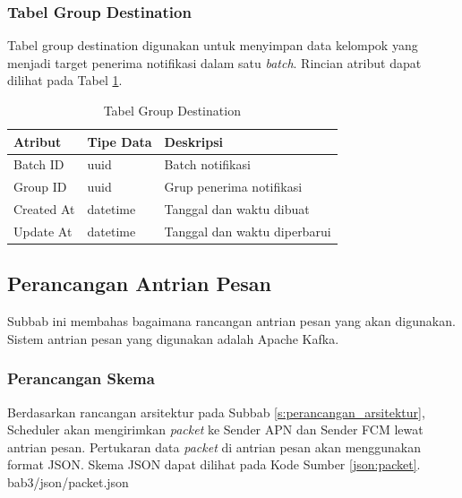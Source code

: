 \subsubsection{Tabel Group Destination}
\par Tabel group destination digunakan untuk menyimpan data kelompok yang menjadi target penerima notifikasi dalam satu \textit{batch}. Rincian atribut dapat dilihat pada Tabel \ref{tabel_group_destination}.
\begin{longtable}{|p{2cm}|p{2.5cm}|p{4.5cm}|}
	\caption{Tabel Group Destination} \label{tabel_group_destination} \\ \hline
    \textbf{Atribut} & \textbf{Tipe Data} & \textbf{Deskripsi} \\ \hline
    Batch ID & uuid & Batch notifikasi \\ \hline
    Group ID & uuid & Grup penerima notifikasi \\ \hline
    Created At & datetime & Tanggal dan waktu dibuat \\ \hline
    Update At & datetime & Tanggal dan waktu diperbarui \\ \hline
\end{longtable}

\subsection{Perancangan Antrian Pesan}
\par Subbab ini membahas bagaimana rancangan antrian pesan yang akan digunakan. Sistem antrian pesan yang digunakan adalah Apache Kafka.

\subsubsection{Perancangan Skema}
\par Berdasarkan rancangan arsitektur pada Subbab \ref{s:perancangan_arsitektur}, Scheduler akan mengirimkan \textit{packet} ke Sender APN dan Sender FCM lewat antrian pesan. Pertukaran data \textit{packet} di antrian pesan akan menggunakan format JSON. Skema JSON dapat dilihat pada Kode Sumber \ref{json:packet}.
 {bab3/json/packet.json}

